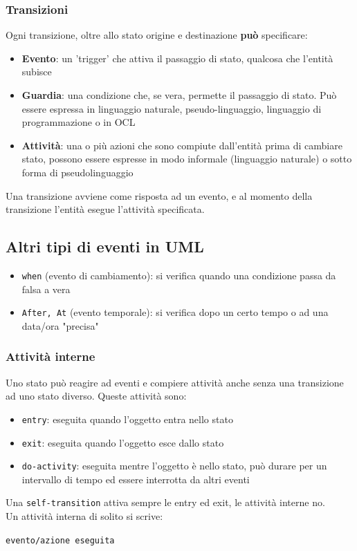 \documentclass[12pt, a4paper]{report}
\begin{document}
\subsubsection{Transizioni}
Ogni transizione, oltre allo stato origine e destinazione \textbf{può} specificare:
\begin{itemize}
    \item \textbf{Evento}: un 'trigger' che attiva il passaggio di stato, qualcosa che l'entità subisce
    \item \textbf{Guardia}: una condizione che, se vera, permette il passaggio di stato. Può essere espressa in linguaggio naturale, pseudo-linguaggio, linguaggio di programmazione o in OCL
    \item \textbf{Attività}: una o più azioni che sono compiute dall'entità prima di cambiare stato, possono essere espresse in modo informale (linguaggio naturale) o sotto forma di pseudolinguaggio
\end{itemize}
Una transizione avviene come risposta ad un evento, e al momento della transizione l'entità esegue l'attività specificata.
\subsection{Altri tipi di eventi in UML}
\begin{itemize}
    \item \texttt{when} (evento di cambiamento): si verifica quando una condizione passa da falsa a vera
    \item \texttt{After, At} (evento temporale): si verifica dopo un certo tempo o ad una data/ora "precisa"
\end{itemize}
\subsubsection{Attività interne}
Uno stato  può reagire ad eventi e compiere attività anche senza una transizione ad uno stato diverso. Queste attività sono:
\begin{itemize}
    \item \texttt{entry}: eseguita quando l'oggetto entra nello stato
    \item \texttt{exit}: eseguita quando l'oggetto esce dallo stato
    \item \texttt{do-activity}: eseguita mentre l'oggetto è nello stato, può durare per un intervallo di tempo ed essere interrotta da altri eventi
\end{itemize}
Una \texttt{self-transition} attiva sempre le entry ed exit, le attività interne no.\\
Un attività interna di solito si scrive:
\begin{center}
    \texttt{evento/azione eseguita}
\end{center}
\end{document}
